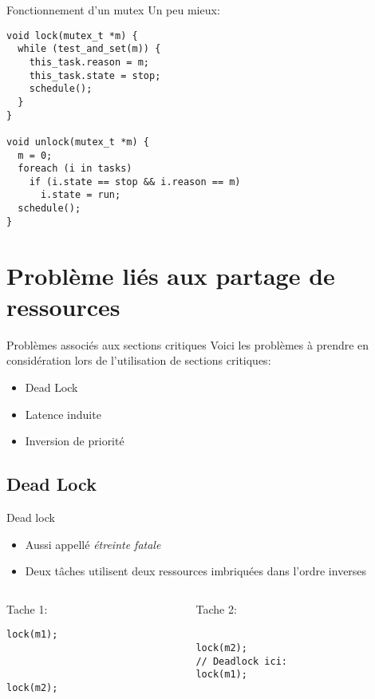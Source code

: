 \begin{frame}[fragile]{Fonctionnement d'un mutex}
  Un peu mieux:
  \begin{lstlisting}
void lock(mutex_t *m) {
  while (test_and_set(m)) {
    this_task.reason = m;
    this_task.state = stop;
    schedule();
  }
}

void unlock(mutex_t *m) {
  m = 0;
  foreach (i in tasks)
    if (i.state == stop && i.reason == m)
      i.state = run;
  schedule();
}
  \end{lstlisting}
\end{frame}

\section{Problème liés aux partage de ressources}

\begin{frame}{Problèmes associés aux sections critiques}
  Voici les problèmes à prendre en considération lors de l'utilisation
  de sections critiques:
  \begin{itemize}
  \item Dead Lock
  \item Latence induite
  \item Inversion de priorité
  \end{itemize}
\end{frame}

\subsection{Dead Lock}

\begin{frame}[fragile]{Dead lock}
  \begin{itemize}
  \item Aussi appellé \emph{étreinte fatale}
  \item Deux tâches utilisent  deux ressources imbriquées dans l'ordre
    inverses
  \end{itemize}
  \begin{columns}
    \begin{column}{5cm}
      Tache 1:
      \begin{lstlisting}[showlines=true,emptylines=10]
lock(m1);



lock(m2);
      \end{lstlisting}
    \end{column}
    \begin{column}{5cm}
      Tache 2:
      \begin{lstlisting}[showlines=true,emptylines=10]

lock(m2);
// Deadlock ici:
lock(m1);

      \end{lstlisting}
    \end{column}
  \end{columns}
  \begin{center}
    
  \end{center}
\end{frame}


